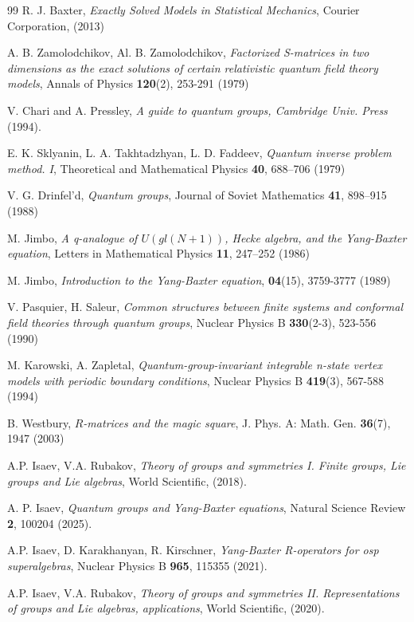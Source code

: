 \documentclass[a4paper]{article}
\renewcommand{\=}{\ =\ }
\numberwithin{equation}{section}
\theoremstyle{remark}
\begin{document}
\begin{thebibliography}{99}
 R. J. Baxter, \textit{Exactly Solved Models in Statistical Mechanics}, Courier Corporation, (2013)

 A. B. Zamolodchikov, Al. B. Zamolodchikov, \textit{Factorized S-matrices in two dimensions as the exact solutions of certain relativistic quantum field theory models}, Annals of Physics \textbf{120}(2), 253-291 (1979)

    V. Chari and A. Pressley, \textit{A guide to quantum groups, Cambridge Univ. Press} (1994).

 E. K. Sklyanin, L. A. Takhtadzhyan, L. D. Faddeev, \textit{Quantum inverse problem method. I}, Theoretical and Mathematical Physics \textbf{40}, 688–706 (1979)

 V. G. Drinfel'd, \textit{Quantum groups}, Journal of Soviet Mathematics \textbf{41}, 898–915 (1988)

 M. Jimbo, \textit{A q-analogue of $U(gl(N+1))$, Hecke algebra, and the Yang-Baxter equation}, Letters in Mathematical Physics \textbf{11}, 247–252 (1986)

 M. Jimbo, \textit{Introduction to the Yang-Baxter equation}, \textbf{04}(15), 3759-3777 (1989)

 V. Pasquier, H. Saleur, \textit{Common structures between finite systems and conformal field theories through quantum groups}, Nuclear Physics B \textbf{330}(2-3), 523-556 (1990)

 M. Karowski, A. Zapletal, \textit{Quantum-group-invariant integrable n-state vertex models with periodic boundary conditions}, Nuclear Physics B \textbf{419}(3), 567-588 (1994)

 B. Westbury, \textit{$R$-matrices and the magic square}, J. Phys. A: Math. Gen. \textbf{36}(7), 1947 (2003)

 A.P. Isaev, V.A. Rubakov, \textit{Theory of groups and symmetries I. Finite groups, Lie groups and Lie algebras}, World Scientific, (2018).

 A. P. Isaev, \textit{Quantum groups and Yang-Baxter equations}, Natural Science Review \textbf{2}, 100204 (2025).

 A.P. Isaev, D. Karakhanyan, R. Kirschner, \textit{Yang-Baxter R-operators for osp superalgebras}, Nuclear Physics B \textbf{965}, 115355 (2021).

 A.P. Isaev, V.A. Rubakov, \textit{Theory of groups and symmetries II. Representations of groups and Lie algebras, applications}, World Scientific, (2020).


\end{thebibliography}
\end{document}
